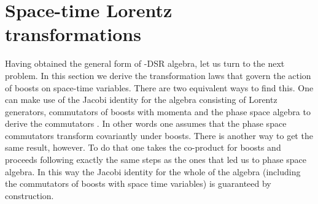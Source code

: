 \documentclass [prd,twocolumn,nofootinbib,showpacs]  {revtex4}
\begin{document}
\section{Space-time Lorentz transformations}

Having obtained the general form of \myHighlight{$\kappa$}\coordHE{}-DSR algebra, let us
turn to the next problem. In this section  we derive the
transformation laws that govern the action of boosts on space-time
variables. There are two equivalent ways to find this. One can
make use of the Jacobi identity for the algebra consisting of
Lorentz generators, commutators of boosts with momenta and the
phase space algebra to derive the commutators \myHighlight{$[N_i, x_\mu]$}\coordHE{}. In
other words one assumes that the phase space commutators transform
covariantly under boosts. There is another way to get the same
result, however. To do that one takes the co-product for boosts
and proceeds following exactly the same steps as the ones that led
us to phase space algebra. In this way the Jacobi identity for the
whole of the algebra (including the commutators of boosts with
space time variables) is  guaranteed by construction.
\newline
\end{document}
